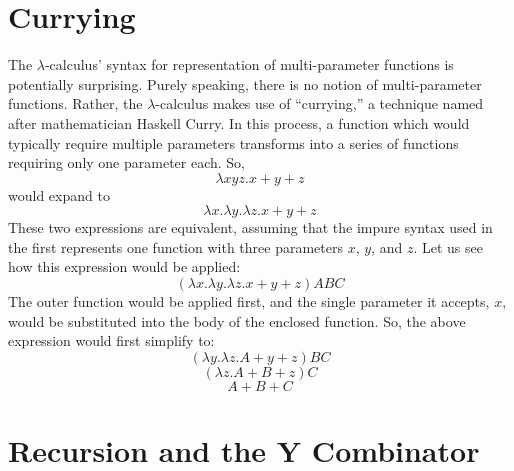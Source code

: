 \documentclass{article}
\begin{document}
\section{Currying}
The $\lambda$-calculus' syntax for representation of multi-parameter functions is potentially surprising. Purely speaking, there is no notion of multi-parameter functions. Rather, the $\lambda$-calculus makes use of ``currying,'' a technique named after mathematician Haskell Curry. In this process, a function which would typically require multiple parameters transforms into a series of functions requiring only one parameter each. So,
$$\lambda xyz.x+y+z$$
would expand to
$$\lambda x.\lambda y.\lambda z.x+y+z$$
These two expressions are equivalent, assuming that the impure syntax used in the first represents one function with three parameters $x$, $y$, and $z$. Let us see how this expression would be applied:
$$(\lambda x.\lambda y.\lambda z.x+y+z)ABC$$
The outer function would be applied first, and the single parameter it accepts, $x$, would be substituted into the body of the enclosed function. So, the above expression would first simplify to:
$$(\lambda y.\lambda z.A+y+z)BC$$
$$(\lambda z.A+B+z)C$$
$$A+B+C$$

\section{Recursion and the Y Combinator}


\end{document}
